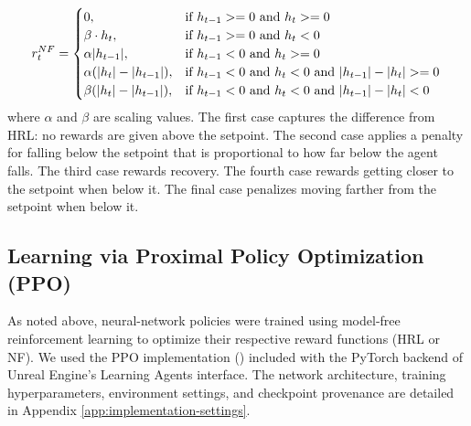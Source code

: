 \documentclass[12pt,fleqn]{article}
\begin{document}
\begin{equation*}
  r^{NF}_t =
  \begin{cases}
    0,                       & \text{if } h_{t-1} >= 0 \text{ and } h_t >= 0                                   \\
    \beta \cdot h_t,         & \text{if } h_{t-1} >= 0 \text{ and } h_t < 0                                    \\
    \alpha|h_{t-1}|,         & \text{if } h_{t-1} < 0 \text{ and } h_t >= 0                                    \\
    \alpha(|h_t|-|h_{t-1}|), & \text{if } h_{t-1} < 0 \text{ and } h_t < 0 \text{ and } |h_{t-1}| - |h_t| >= 0 \\
    \beta(|h_t|-|h_{t-1}|),  & \text{if } h_{t-1} < 0 \text{ and } h_t < 0 \text{ and } |h_{t-1}| - |h_t| < 0
  \end{cases} \\
\end{equation*}
where \(\alpha\) and \(\beta\) are scaling values. The first case captures the difference from HRL: no rewards are given above the setpoint. The second case applies a penalty for falling below the setpoint that is proportional to how far below the agent falls. The third case rewards recovery. The fourth case rewards getting closer to the setpoint when below it. The final case penalizes moving farther from the setpoint when below it.

\subsection{Learning via Proximal Policy Optimization (PPO)}

As noted above, neural-network policies were trained using model-free reinforcement learning to optimize their respective reward functions (HRL or NF). We used the PPO implementation (\cite{schulman_proximal_2017}) included with the PyTorch backend of Unreal Engine's Learning Agents interface. The network architecture, training hyperparameters, environment settings, and checkpoint provenance are detailed in Appendix \ref{app:implementation-settings}.
\end{document}
